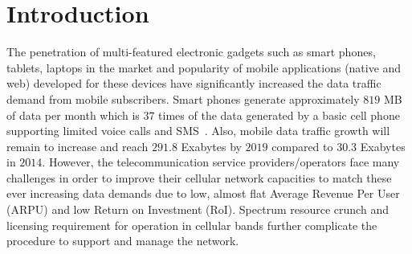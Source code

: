 \documentclass[conference]{IEEEtran}
\begin{document}
\begin{abstract}
\end{abstract}
\IEEEpeerreviewmaketitle


\section{Introduction}
\label{sec:intro}
\par The penetration of multi-featured electronic gadgets such as smart phones, tablets, laptops in the market and popularity of mobile applications (native and web) developed for these devices have significantly increased the data traffic demand from mobile subscribers. Smart phones generate approximately $819$ MB of data per month which is $37$ times of the data generated by a basic cell phone supporting limited voice calls and SMS~\cite{cicso_vni}. Also, mobile data traffic growth will remain to increase and reach $291.8$ Exabytes by $2019$ compared to $30.3$ Exabytes in $2014$. However, the telecommunication service providers/operators face many challenges in order to improve their cellular network capacities to match these ever increasing data demands due to low, almost flat Average Revenue Per User (ARPU) and low Return on Investment (RoI). Spectrum resource crunch and licensing requirement for operation in cellular bands further complicate the procedure to support and manage the network. 
\end{document}
